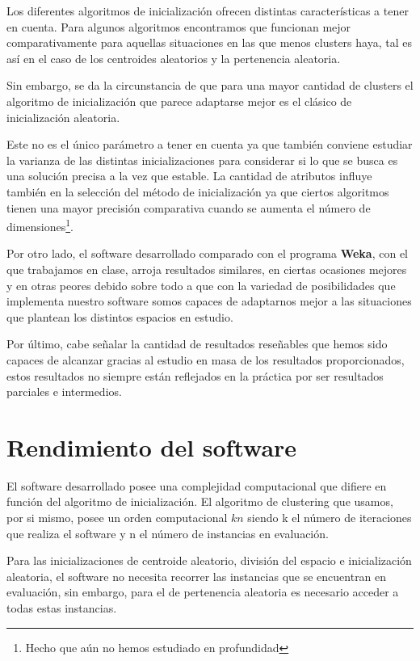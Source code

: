 \documentclass[a4paper]{report}
\begin{document}
	Los diferentes algoritmos de inicialización ofrecen distintas características a tener en cuenta. Para algunos algoritmos encontramos que funcionan mejor comparativamente para aquellas situaciones en las que menos clusters haya, tal es así en el caso de los centroides aleatorios y la pertenencia aleatoria. 
	
	Sin embargo, se da la circunstancia de que para una mayor cantidad de clusters el algoritmo de inicialización que parece adaptarse mejor es el clásico de inicialización aleatoria.
	
	Este no es el único parámetro a tener en cuenta ya que también conviene estudiar la varianza de las distintas inicializaciones para considerar si lo que se busca es una solución precisa a la vez que estable. La cantidad de atributos influye también en la selección del método de inicialización ya que ciertos algoritmos tienen una mayor precisión comparativa cuando se aumenta el número de dimensiones\footnote{Hecho que aún no hemos estudiado en profundidad}.
	
	Por otro lado, el software desarrollado comparado con el programa \textbf{Weka}, con el que trabajamos en clase, arroja resultados similares, en ciertas ocasiones mejores y en otras peores debido sobre todo a que con la variedad de posibilidades que implementa nuestro software somos capaces de adaptarnos mejor a las situaciones que plantean los distintos espacios en estudio.
	
	Por último, cabe señalar la cantidad de resultados reseñables que hemos sido capaces de alcanzar gracias al estudio en masa de los resultados proporcionados, estos resultados no siempre están reflejados en la práctica por ser resultados parciales e intermedios.
	\section{Rendimiento del software}
	El software desarrollado posee una complejidad computacional que difiere en función del algoritmo de inicialización. El algoritmo de clustering que usamos, por si mismo, posee un orden computacional $kn$ siendo k el número de iteraciones que realiza el software y n el número de instancias en evaluación.
	
	Para las inicializaciones de centroide aleatorio, división del espacio e inicialización aleatoria, el software no necesita recorrer las instancias que se encuentran en evaluación, sin embargo, para el de pertenencia aleatoria es necesario acceder a todas estas instancias.
	
\end{document}
